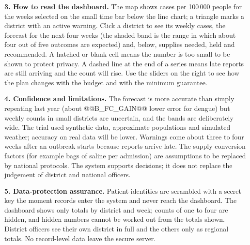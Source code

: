 \textbf{3. How to read the dashboard.} The map shows cases per 100\,000 people for the weeks selected on the small time bar below the line chart; a triangle marks a district with an active warning. Click a district to see its weekly cases, the forecast for the next four weeks (the shaded band is the range in which about four out of five outcomes are expected) and, below, supplies needed, held and recommended. A hatched or blank cell means the number is too small to be shown to protect privacy. A dashed line at the end of a series means late reports are still arriving and the count will rise. Use the sliders on the right to see how the plan changes with the budget and with the minimum guarantee.

\textbf{4. Confidence and limitations.} The forecast is more accurate than simply repeating last year (about @@B_FC_GAIN@@ lower error for dengue) but weekly counts in small districts are uncertain, and the bands are deliberately wide. The trial used synthetic data, approximate populations and simulated weather; accuracy on real data will be lower. Warnings come about three to four weeks after an outbreak starts because reports arrive late. The supply conversion factors (for example bags of saline per admission) are assumptions to be replaced by national protocols. The system supports decisions; it does not replace the judgement of district and national officers.

\textbf{5. Data-protection assurance.} Patient identities are scrambled with a secret key the moment records enter the system and never reach the dashboard. The dashboard shows only totals by district and week; counts of one to four are hidden, and hidden numbers cannot be worked out from the totals shown. District officers see their own district in full and the others only as regional totals. No record-level data leave the secure server.

